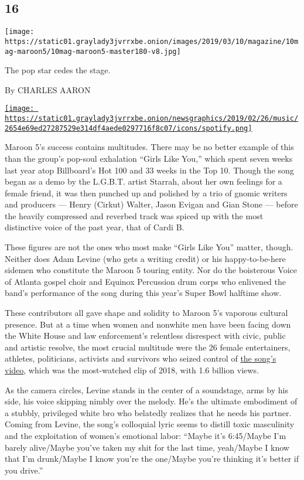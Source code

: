 \hypertarget{16}{%
\subsection{16}\label{16}}

\texttt{[image: https://static01.graylady3jvrrxbe.onion/images/2019/03/10/magazine/10mag-maroon5/10mag-maroon5-master180-v8.jpg]}

The pop star cedes the stage.

By CHARLES AARON

\href{https://open.spotify.com/track/6FRLCMO5TUHTexlWo8ym1W}{\texttt{[image: https://static01.graylady3jvrrxbe.onion/newsgraphics/2019/02/26/music/2654e69ed27287529e314df4aede0297716f8c07/icons/spotify.png]}}

Maroon 5's success contains multitudes. There may be no better example
of this than the group's pop-soul exhalation ``Girls Like You,'' which
spent seven weeks last year atop Billboard's Hot 100 and 33 weeks in the
Top 10. Though the song began as a demo by the L.G.B.T. artist Starrah,
about her own feelings for a female friend, it was then punched up and
polished by a trio of gnomic writers and producers --- Henry (Cirkut)
Walter, Jason Evigan and Gian Stone --- before the heavily compressed
and reverbed track was spiced up with the most distinctive voice of the
past year, that of Cardi B.

These figures are not the ones who most make ``Girls Like You'' matter,
though. Neither does Adam Levine (who gets a writing credit) or his
happy-to-be-here sidemen who constitute the Maroon 5 touring entity. Nor
do the boisterous Voice of Atlanta gospel choir and Equinox Percussion
drum corps who enlivened the band's performance of the song during this
year's Super Bowl halftime show.

These contributors all gave shape and solidity to Maroon 5's vaporous
cultural presence. But at a time when women and nonwhite men have been
facing down the White House and law enforcement's relentless disrespect
with civic, public and artistic resolve, the most crucial multitude were
the 26 female entertainers, athletes, politicians, activists and
survivors who seized control of
\href{https://www.youtube.com/watch?v=aJOTlE1K90k}{the song's video},
which was the most-watched clip of 2018, with 1.6 billion views.

As the camera circles, Levine stands in the center of a soundstage, arms
by his side, his voice skipping nimbly over the melody. He's the
ultimate embodiment of a stubbly, privileged white bro who belatedly
realizes that he needs his partner. Coming from Levine, the song's
colloquial lyric seems to distill toxic masculinity and the exploitation
of women's emotional labor: ``Maybe it's 6:45/Maybe I'm barely
alive/Maybe you've taken my shit for the last time, yeah/Maybe I know
that I'm drunk/Maybe I know you're the one/Maybe you're thinking it's
better if you drive.''

